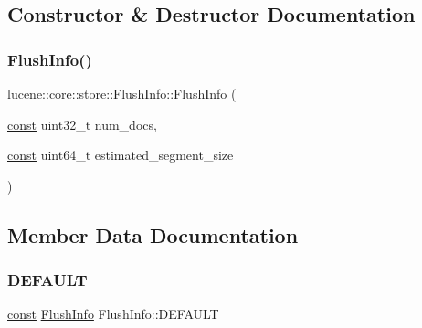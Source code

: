 \subsection{Constructor \& Destructor Documentation}
\mbox{\label{classlucene_1_1core_1_1store_1_1FlushInfo_a15bce5aacea0842397f57a9c80a431bb}} 
\subsubsection{\texorpdfstring{Flush\+Info()}{FlushInfo()}}
{\footnotesize\ttfamily lucene\+::core\+::store\+::\+Flush\+Info\+::\+Flush\+Info (\begin{DoxyParamCaption}\item[{\mbox{\hyperlink{ZlibCrc32_8h_a2c212835823e3c54a8ab6d95c652660e}{const}} uint32\+\_\+t}]{num\+\_\+docs,  }\item[{\mbox{\hyperlink{ZlibCrc32_8h_a2c212835823e3c54a8ab6d95c652660e}{const}} uint64\+\_\+t}]{estimated\+\_\+segment\+\_\+size }\end{DoxyParamCaption})\hspace{0.3cm}{\ttfamily [inline]}}



\subsection{Member Data Documentation}
\mbox{\label{classlucene_1_1core_1_1store_1_1FlushInfo_ae3bd10904cadef389ecb82cf54dc1c7f}} 
\subsubsection{\texorpdfstring{D\+E\+F\+A\+U\+LT}{DEFAULT}}
{\footnotesize\ttfamily \mbox{\hyperlink{ZlibCrc32_8h_a2c212835823e3c54a8ab6d95c652660e}{const}} \mbox{\hyperlink{classlucene_1_1core_1_1store_1_1FlushInfo}{Flush\+Info}} Flush\+Info\+::\+D\+E\+F\+A\+U\+LT\hspace{0.3cm}{\ttfamily [static]}}

